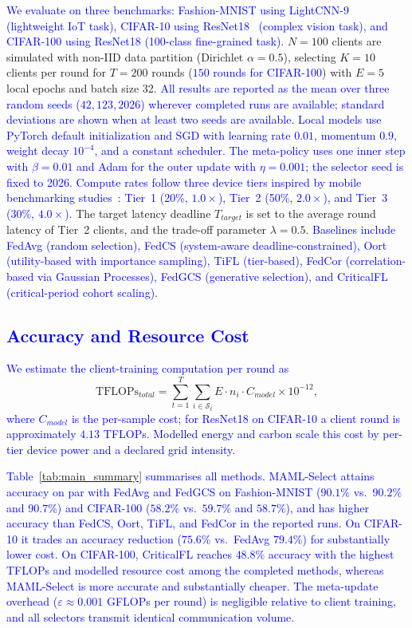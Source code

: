\documentclass[journal]{IEEEtran}
\newcommand{\revision}[1]{\textcolor{blue}{#1}}
\begin{document}
\revision{We evaluate on three benchmarks: Fashion-MNIST using LightCNN-9~\cite{wu2018light} (lightweight IoT task), CIFAR-10 using ResNet18~\cite{he2016deep} (complex vision task), and CIFAR-100 using ResNet18 (100-class fine-grained task).} $N = 100$ clients are simulated with non-IID data partition (Dirichlet $\alpha = 0.5$), selecting $K = 10$ clients per round for $T = 200$ rounds (\revision{$150$ rounds for CIFAR-100}) with $E = 5$ local epochs and batch size 32. \revision{All results are reported as the mean over three random seeds ($42, 123, 2026$) wherever completed runs are available; standard deviations are shown when at least two seeds are available.} \revision{Local models use PyTorch default initialization and SGD with learning rate $0.01$, momentum $0.9$, weight decay $10^{-4}$, and a constant scheduler. The meta-policy uses one inner step with $\beta=0.01$ and Adam for the outer update with $\eta=0.001$; the selector seed is fixed to 2026.} \revision{Compute rates follow three device tiers inspired by mobile benchmarking studies~\cite{ignatov2018ai}: Tier~1 (20\%, $1.0\times$), Tier~2 (50\%, $2.0\times$), and Tier~3 (30\%, $4.0\times$).} The target latency deadline $T_{target}$ is set to the average round latency of Tier~2 clients, and the trade-off parameter $\lambda = 0.5$. \revision{Baselines include FedAvg (random selection), FedCS (system-aware deadline-constrained), Oort (utility-based with importance sampling), TiFL (tier-based), FedCor (correlation-based via Gaussian Processes), FedGCS (generative selection), and CriticalFL (critical-period cohort scaling).}

\subsection{\revision{Accuracy and Resource Cost}}
\revision{We estimate the client-training computation per round as}
\begin{equation}
	\text{TFLOPs}_{total} = \sum_{t=1}^{T} \sum_{i \in \mathcal{S}_t} E \cdot n_i \cdot C_{model} \times 10^{-12},
	\label{eq:tflops}
\end{equation}
\revision{where $C_{model}$ is the per-sample cost; for ResNet18 on CIFAR-10 a client round is approximately $4.13$ TFLOPs. Modelled energy and carbon scale this cost by per-tier device power and a declared grid intensity.}

\revision{Table~\ref{tab:main_summary} summarises all methods. MAML-Select attains accuracy on par with FedAvg and FedGCS on Fashion-MNIST ($90.1\%$ vs.\ $90.2\%$ and $90.7\%$) and CIFAR-100 ($58.2\%$ vs.\ $59.7\%$ and $58.7\%$), and has higher accuracy than FedCS, Oort, TiFL, and FedCor in the reported runs. On CIFAR-10 it trades an accuracy reduction ($75.6\%$ vs.\ FedAvg $79.4\%$) for substantially lower cost. On CIFAR-100, CriticalFL reaches $48.8\%$ accuracy with the highest TFLOPs and modelled resource cost among the completed methods, whereas MAML-Select is more accurate and substantially cheaper. The meta-update overhead ($\varepsilon \approx 0.001$ GFLOPs per round) is negligible relative to client training, and all selectors transmit identical communication volume.}
\end{document}
